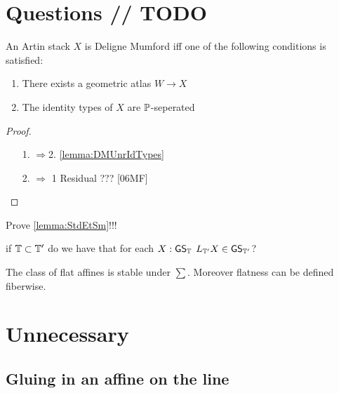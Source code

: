 \documentclass{article}
\renewcommand{\GS}{\mathsf{GS}}
\begin{document}
%





\section{Questions // TODO}
\begin{theorem}[TODO]
	An Artin stack $X$ is Deligne Mumford iff one of the following conditions is satisfied:
	\begin{enumerate}
		\item There exists a geometric atlas $W \to X$
		\item The identity types of $X$ are $\mathbb{P}$-seperated
	\end{enumerate}
\end{theorem}
\begin{proof}
	\begin{enumerate}
		\item [1. $\Rightarrow $2.] \ref{lemma:DMUnrIdTypes}
		\item [2. $\Rightarrow$ 1] Residual ??? [06MF]
	\end{enumerate}
\end{proof}
Prove \ref{lemma:StdEtSm}!!!
\begin{question}
	if $\mathbb{T} \subset \mathbb{T}'$ do we have that for each $X : \GS_\bT$ $L_{\bT'} X \in \GS_{\bT'}$?
\end{question}
\begin{theorem}[TODO]{\label{thm:FlatAffines}}
	The class of flat affines is stable under $\sum$. Moreover flatness can be defined fiberwise.
\end{theorem}
\section{Unnecessary}


\subsection{Gluing in an affine on the line}
\end{document}
